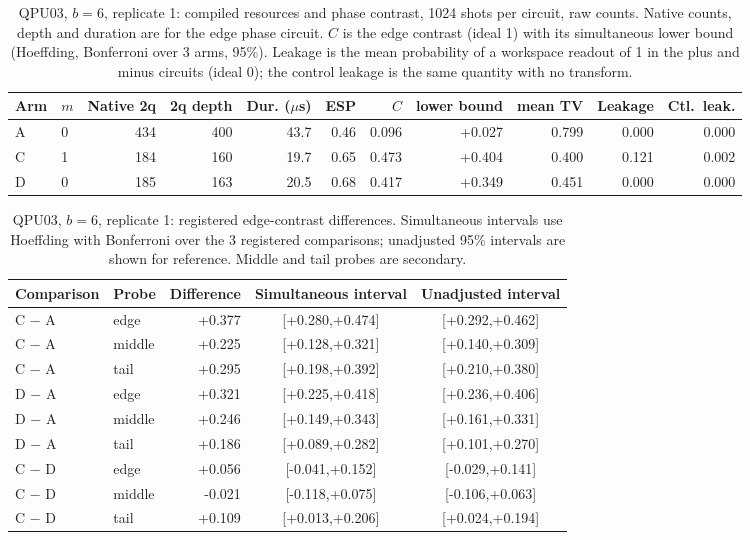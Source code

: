 \begin{table}[htbp]\centering\scriptsize\setlength{\tabcolsep}{3pt}
\caption{QPU03, $b=6$, replicate 1: compiled resources and phase contrast, 1024 shots per circuit, raw counts. Native counts, depth and duration are for the edge phase circuit. $C$ is the edge contrast (ideal 1) with its simultaneous lower bound (Hoeffding, Bonferroni over 3 arms, 95\%). Leakage is the mean probability of a workspace readout of 1 in the plus and minus circuits (ideal 0); the control leakage is the same quantity with no transform.}\label{tab:q3-b6r1}
\begin{tabular}{llrrrrrrrrr}\toprule Arm & $m$ & Native 2q & 2q depth & Dur. ($\mu$s) & ESP & $C$ & lower bound & mean TV & Leakage & Ctl.\ leak.\\\midrule
A & 0 & 434 & 400 & 43.7 & 0.46 & 0.096 & +0.027 & 0.799 & 0.000 & 0.000\\
C & 1 & 184 & 160 & 19.7 & 0.65 & 0.473 & +0.404 & 0.400 & 0.121 & 0.002\\
D & 0 & 185 & 163 & 20.5 & 0.68 & 0.417 & +0.349 & 0.451 & 0.000 & 0.000\\
\bottomrule\end{tabular}\end{table}

\begin{table}[htbp]\centering\scriptsize\setlength{\tabcolsep}{3pt}
\caption{QPU03, $b=6$, replicate 1: registered edge-contrast differences. Simultaneous intervals use Hoeffding with Bonferroni over the 3 registered comparisons; unadjusted 95\% intervals are shown for reference. Middle and tail probes are secondary.}\label{tab:q3d-b6r1}
\begin{tabular}{llrcc}\toprule Comparison & Probe & Difference & Simultaneous interval & Unadjusted interval\\\midrule
C $-$ A & edge & +0.377 & [+0.280,+0.474] & [+0.292,+0.462]\\
C $-$ A & middle & +0.225 & [+0.128,+0.321] & [+0.140,+0.309]\\
C $-$ A & tail & +0.295 & [+0.198,+0.392] & [+0.210,+0.380]\\
D $-$ A & edge & +0.321 & [+0.225,+0.418] & [+0.236,+0.406]\\
D $-$ A & middle & +0.246 & [+0.149,+0.343] & [+0.161,+0.331]\\
D $-$ A & tail & +0.186 & [+0.089,+0.282] & [+0.101,+0.270]\\
C $-$ D & edge & +0.056 & [-0.041,+0.152] & [-0.029,+0.141]\\
C $-$ D & middle & -0.021 & [-0.118,+0.075] & [-0.106,+0.063]\\
C $-$ D & tail & +0.109 & [+0.013,+0.206] & [+0.024,+0.194]\\
\bottomrule\end{tabular}\end{table}

